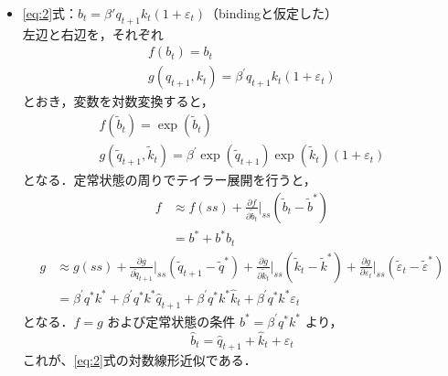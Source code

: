 \documentclass[dvipdfmx]{jlreq}
\begin{document}
\begin{itemize}
  \item \eqref{eq:2}式：$b_t = \beta\prime q_{t+1} k_t (1+\varepsilon_t)$（bindingと仮定した） \\
    左辺と右辺を，それぞれ
    \begin{gather}
      f(b_t) = b_t \\
      g(q_{t+1}, k_t) = \beta^\prime q_{t+1} k_t (1+\varepsilon_t)
    \end{gather}
    とおき，変数を対数変換すると，
    \begin{gather}
      f(\widetilde{b}_t) = \exp(\widetilde{b}_t) \\
      g(\widetilde{q}_{t+1}, \widetilde{k}_t) = \beta^\prime \exp(\widetilde{q}_{t+1}) \exp(\widetilde{k}_t) (1+\varepsilon_t)
    \end{gather}
    となる．定常状態の周りでテイラー展開を行うと，
    \begin{equation}
      \begin{split}
        f &\approx f(ss) + \frac{\partial f}{\partial \widetilde{b}_t} \bigg|_{ss} (\widetilde{b}_t - \widetilde{b}^*) \\
        &= b^* + b^* \widehat{b}_t
      \end{split}
    \end{equation}
    \begin{equation}
      \begin{split}
        g &\approx g(ss) + \frac{\partial g}{\partial \widetilde{q}_{t+1}} \bigg|_{ss} (\widetilde{q}_{t+1} - \widetilde{q}^*) + \frac{\partial g}{\partial \widetilde{k}_t} \bigg|_{ss} (\widetilde{k}_t - \widetilde{k}^*) + \frac{\partial g}{\partial \varepsilon_t} \bigg|_{ss} (\widetilde{\varepsilon}_t - \widetilde{\varepsilon}^*) \\
        &= \beta^\prime q^* k^* + \beta^\prime q^* k^* \widehat{q}_{t+1} + \beta^\prime q^* k^* \widehat{k}_t + \beta^\prime q^* k^* \varepsilon_t
      \end{split}
    \end{equation}
    となる．$f=g$ および定常状態の条件 $b^* = \beta^\prime q^* k^*$ より，
    \begin{equation}
      \widehat{b}_t = \widehat{q}_{t+1} + \widehat{k}_t + \varepsilon_t
    \end{equation}
    これが、\eqref{eq:2}式の対数線形近似である．


\end{itemize}
\end{document}
